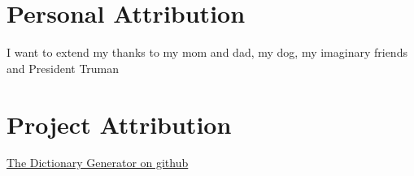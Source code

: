 \documentclass[main.tex]{subfiles}
\begin{document}
  \begin{multicols}{2}
  
    \section{Personal Attribution}

      I want to extend my thanks to my mom and dad, my dog, my imaginary friends and President Truman

    \section{Project Attribution}

      \href{https://github.com/jsburke/conlang-dictionary}{The Dictionary Generator on github}
  \end{multicols}
\end{document}
